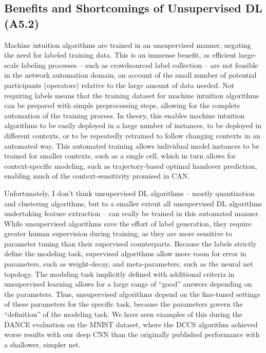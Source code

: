 		\subsection{Benefits and Shortcomings of Unsupervised DL (A5.2)}

			Machine intuition algorithms are trained in an unsupervised manner, negating the need for labeled training data.
			This is an immense benefit, as efficient large-scale labeling processes -- such as crowdsourced label collection -- are not feasible in the network automation domain, on account of the small number of potential participants (operators) relative to the large amount of data needed.
			Not requiring labels means that the training dataset for machine intuition algorithms can be prepared with simple preprocessing steps, allowing for the complete automation of the training process.
			In theory, this enables machine intuition algorithms to be easily deployed in a large number of instances, to be deployed in different contexts, or to be repeatedly retrained to follow changing contexts in an automated way.
			This automated training allows individual model instances to be trained for smaller contexts, such as a single cell, which in turn allows for context-specific modeling, such as trajectory-based optimal handover prediction, enabling much of the context-sensitivity promised in \ac{CAN}.
			
			Unfortunately, I don't think unsupervised \ac{DL} algorithms -- mostly quantization and clustering algorithms, but to a smaller extent all unsupervised \ac{DL} algorithms undertaking feature extraction -- can really be trained in this automated manner.
			While unsupervised algorithms save the effort of label generation, they require greater human supervision during training, as they are more sensitive to parameter tuning than their supervised counterparts.
			Because the labels strictly define the modeling task, supervised algorithms allow more room for error in parameters, such as weight-decay, and meta-parameters, such as the neural net topology.
			The modeling task implicitly defined with additional criteria in unsupervised learning allows for a large range of ``good'' answers depending on the parameters.
			Thus, unsupervised algorithms depend on the fine-tuned settings of these parameters for the specific task, because the parameters govern the ``definition'' of the modeling task. 
			We have seen examples of this during the \ac{DANCE} evaluation on the MNIST dataset, where the \ac{DCCS} algorithm achieved worse results with our deep \ac{CNN} than the originally published performance with a shallower, simpler net.
			

